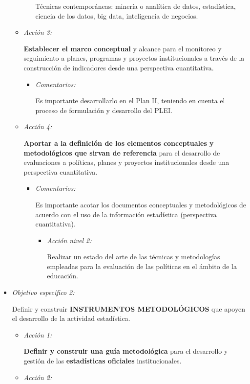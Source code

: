 \documentclass[
]{book}
\begin{document}
\begin{itemize}
\begin{itemize}
\begin{itemize}
      Técnicas contemporáneas: minería o analítica de datos, estadística, ciencia de los datos, big data, inteligencia de negocios.
    \end{itemize}
  \item
    \emph{Acción 3:}

    \textbf{Establecer el marco conceptual} y alcance para el monitoreo y seguimiento a planes, programas y proyectos institucionales a través de la construcción de indicadores desde una perspectiva cuantitativa.

    \begin{itemize}
    \item
      \emph{Comentarios:}

      Es importante desarrollarlo en el Plan II, teniendo en cuenta el proceso de formulación y desarrollo del PLEI.
    \end{itemize}
  \item
    \emph{Acción 4:}

    \textbf{Aportar a la definición de los elementos conceptuales y metodológicos que sirvan de referencia} para el desarrollo de evaluaciones a políticas, planes y proyectos institucionales desde una perspectiva cuantitativa.

    \begin{itemize}
    \item
      \emph{Comentarios:}

      Es importante acotar los documentos conceptuales y metodológicos de acuerdo con el uso de la información estadística (perspectiva cuantitativa).

      \begin{itemize}
      \item
        \emph{Acción nivel 2:}

        Realizar un estado del arte de las técnicas y metodologías empleadas para la evaluación de las políticas en el ámbito de la educación.
      \end{itemize}
    \end{itemize}
  \end{itemize}
\item
  \emph{Objetivo específico 2:}

  Definir y construir \textbf{INSTRUMENTOS METODOLÓGICOS} que apoyen
  el desarrollo de la actividad estadística.

  \begin{itemize}
  \item
    \emph{Acción 1:}

    \textbf{Definir y construir una guía metodológica} para el desarrollo y gestión de las \textbf{estadísticas oficiales} institucionales.
  \item
    \emph{Acción 2:}


\end{itemize}
\end{itemize}
\end{document}

